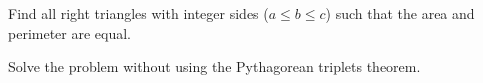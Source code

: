 Find all right triangles with integer sides ($a \le b \le c$) such that the area and perimeter are equal.

Solve the problem without using the Pythagorean triplets theorem. 